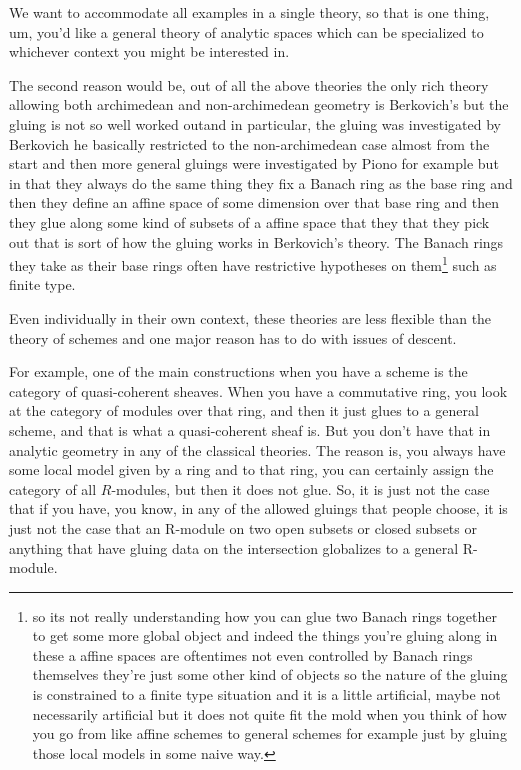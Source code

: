\begin{answer}
    
        We want to accommodate all examples in a single theory, so that is one thing, um, you'd like a general theory of analytic spaces which can be specialized to whichever context you might be interested in.

        
        The second reason would be, out of all the above theories the only rich theory allowing both archimedean and non-archimedean geometry is Berkovich's but the gluing is not so well worked outand in particular, the gluing was investigated by Berkovich he basically restricted to the non-archimedean case almost from the start and then more general gluings were investigated by Piono  \citeme{} for example but in that they always do the same thing they fix a Banach ring as the base ring and then they define an affine space of some dimension over that base ring and then they glue along some kind of subsets of a affine space that they that they pick out that is sort of how the gluing works in Berkovich's theory. The Banach rings they take as their base rings often have restrictive hypotheses on them\footnote{so its not really understanding how you can glue two Banach rings together to get some more global object and indeed the things you're gluing along in these a affine spaces are oftentimes not even controlled by Banach rings themselves they're just some other kind of objects so the nature of the gluing is constrained to a finite type situation and it is a little artificial, maybe not necessarily artificial but it does not quite fit the mold when you think of how you go from like affine schemes to general schemes for example just by gluing those local models in some naive way.} such as finite type.

        
         Even individually in their own context, these theories are less flexible than the theory of schemes and one major reason has to do with issues of descent.

\end{answer}

    For example, one of the main constructions when you have a scheme is the category of quasi-coherent sheaves. When you have a commutative ring, you look at the category of modules over that ring, and then it just glues to a general scheme, and that is what a quasi-coherent sheaf is. But you don't have that in analytic geometry in any of the classical theories. The reason is, you always have some local model given by a ring and to that ring, you can certainly assign the category of all $R$-modules, but then it does not glue. So, it is just not the case that if you have, you know, in any of the allowed gluings that people choose, it is just not the case that an R-module on two open subsets or closed subsets or anything that have gluing data on the intersection globalizes to a general R-module.

